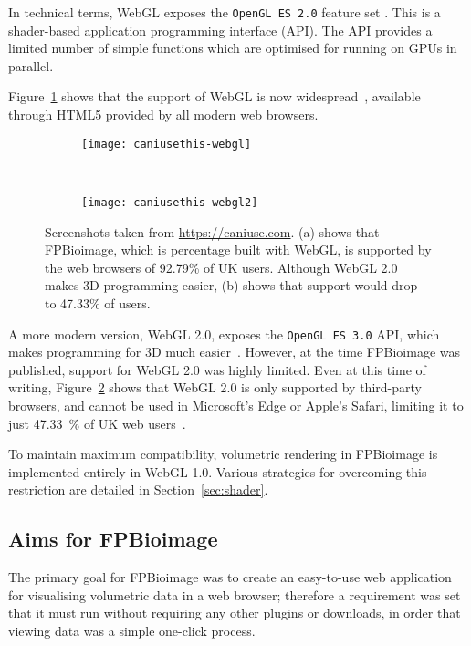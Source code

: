In technical terms, WebGL exposes the \texttt{OpenGL ES 2.0} feature set \cite{khronos2009webgl}.
This is a shader-based application programming interface (API).
The API provides a limited number of simple functions which are optimised for running on GPUs in parallel. 

Figure~\ref{fig:caniusethis-webgl} shows that the support of WebGL is now widespread~\cite{caniuse}, available through HTML5 provided by all modern web browsers.

\begin{figure}[htb!]
\centering
\begin{subfigure}[b]{1.0\textwidth}
\texttt{[image: caniusethis-webgl]}
\caption{} \label{fig:caniusethis-webgl}
\end{subfigure}

~\newline
\begin{subfigure}[b]{1.0\textwidth}
\texttt{[image: caniusethis-webgl2]}
\caption{} \label{fig:caniusethis-webgl2}
\end{subfigure}
\caption[FPBioimage: WebGL is supported by 92.79\% of users browsing the web]{Screenshots taken from \url{https://caniuse.com}\cite{caniuse}. (a) shows that FPBioimage, which is percentage built with WebGL, is supported by the web browsers of 92.79\% of UK users. Although WebGL 2.0 makes 3D programming easier, (b) shows that support would drop to 47.33\% of users.  }
\label{fig:caniusethis}
\end{figure}

A more modern version, WebGL 2.0, exposes the \texttt{OpenGL ES 3.0} API, which makes programming for 3D much easier~\cite{webgl2}.
However, at the time FPBioimage was published, support for WebGL 2.0 was highly limited. 
Even at this time of writing, Figure~\ref{fig:caniusethis-webgl2} shows that WebGL 2.0 is only supported by third-party browsers, and cannot be used in Microsoft's Edge or Apple's Safari, limiting it to just \SI{47.33}{\percent} of UK web users~\cite{caniuse}.

To maintain maximum compatibility, volumetric rendering in FPBioimage is implemented entirely in WebGL 1.0.
Various strategies for overcoming this restriction are detailed in Section~\ref{sec:shader}.

\subsection{Aims for FPBioimage} 
The primary goal for FPBioimage was to create an easy-to-use web application for visualising volumetric data in a web browser; therefore a requirement was set that it must run without requiring any other plugins or downloads, in order that viewing data was a simple one-click process. 

